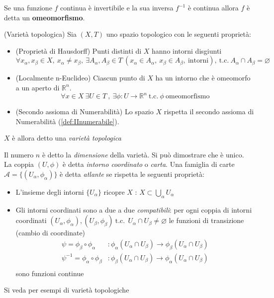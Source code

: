 Se una funzione $f$ continua è invertibile e la sua inversa $f^{-1}$ è continua allora
$f$ è detta un \textbf{omeomorfismo}.
\begin{definition}{(Varietà topologica)}
\label{def:var_topologica}
   Sia $(X ,T)$ uno spazio topologico con le seguenti proprietà:
  \begin{itemize}
     \item (Proprietà di Hausdorff) Punti distinti di $X$ hanno intorni disgiunti
     $$\forall x_\alpha,x_\beta \in X, \: x_\alpha \neq x_\beta , \:
       \exists A_\alpha , A_\beta \in T \: (x_\alpha \in A_\alpha , \:
       x_\beta \in A_\beta ,\: \mathrm{intorni}), \: \mathrm{t.c.} \: A_\alpha \cap A_\beta = \varnothing $$
     \item (Localmente n-Euclideo) Ciascun punto di $X$ ha un intorno che è
     omeomorfo a un aperto di $\mathbb{R}^n$.
     $$
       \forall x \in X \: \exists U \in T \:,\: \exists\phi : U \to \mathbb{R}^n
          \mathrm{\: t.c.\:} \phi \mathrm{\: omeomorfismo}
     $$
     \item (Secondo assioma di Numerabilità) Lo spazio $X$ rispetta il secondo assioma di Numerabilità (\ref{def:IInumerabile}).
  \end{itemize}
  $X$ è allora detto una \emph{varietà topologica}
\end{definition}
Il numero $n$ è detto la \emph{dimensione} della varietà. Si può dimostrare che è unico.\\
La coppia $(U,\phi)$ è detta \emph{intorno coordinato} o \emph{carta}.
Una famiglia di carte $\mathcal{A} = \{ (U_\alpha , \phi_\alpha) \}$ è detta
\emph{atlante} se rispetta le seguenti proprietà:
\begin{itemize}
    \item L'insieme degli intorni $\{U_\alpha\}$ ricopre $X$ :
        $X \subset \bigcup \limits_\alpha U_\alpha$
    \item Gli intorni coordinati sono a due a due \emph{compatibili}: per ogni coppia
    di intorni coordinati
       $(U_\alpha , \phi_\alpha), (U_\beta , \phi_\beta) \mathrm{\:t.c.\:} \:
       U_\alpha \cap U_\beta \neq \varnothing $
    le funzioni di transizione (cambio di coordinate)
    \begin{equation*}
        \begin{split}
           \psi = \phi_\beta \circ \phi_\alpha &: \phi_\alpha(U_\alpha \cap U_\beta)
              \to \phi_\beta (U_\alpha \cap U_\beta) \\
           \psi^{-1} = \phi_\alpha \circ \phi_\beta &: \phi_\beta(U_\alpha \cap U_\beta)
              \to \phi_\alpha (U_\alpha \cap U_\beta) \\
        \end{split}
    \end{equation*}
    sono funzioni continue
\end{itemize}
Si veda \cite{sernesi} per esempi di varietà topologiche\\

